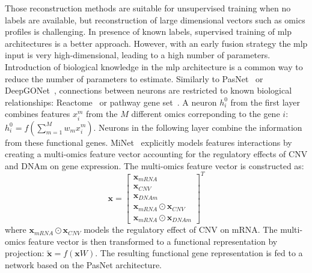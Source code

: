 \documentclass[../main.tex]{subfiles}
\begin{document}
		Those reconstruction methods are suitable for unsupervised training when no labels are available, but reconstruction of large dimensional vectors such as omics profiles is challenging. 
		In presence of known labels, supervised training of \gls{mlp} architectures is a better approach. 
		However, with an early fusion strategy the \gls{mlp} input is very high-dimensional, leading to a high number of parameters. 
		Introduction of biological knowledge in the \gls{mlp} architecture is a common way to reduce the number of parameters to estimate. 
		Similarly to PasNet~\cite{haoPASNetPathwayassociatedSparse2018} or DeepGONet~\cite{bourgeaisDeepGONetSelfexplainable2021}, connections between neurons are restricted to known biological relationships: Reactome~\cite{PNet} or pathway gene set~\cite{DeepOmix}.
		A neuron \(h^{0}_{i}\) from the first layer combines features \(x_{i}^{m}\) from the \(M\) different omics correponding to the gene \(i\): \(h^{0}_{i} = f\left( \sum_{m=1}^{M} w_{m}x_{i}^{m} \right) \). 
		Neurons in the following layer combine the information from these functional genes. 
		MiNet~\cite{Hao2019} explicitly models features interactions by creating a multi-omics feature vector accounting for the regulatory effects of CNV and DNAm on gene expression. 
		The multi-omics feature vector is constructed as:
		\begin{equation}
			\symbf{x} = {
				\begin{bmatrix}
				\symbf{x}_{mRNA}\\ 
				\symbf{x}_{CNV}\\ 
				\symbf{x}_{DNAm}\\ 
				\symbf{x}_{mRNA}\odot \symbf{x}_{CNV}\\ 
				\symbf{x}_{mRNA}\odot \symbf{x}_{DNAm} 
			\end{bmatrix}
			}^T
		\end{equation}
		where \(\symbf{x}_{mRNA}\odot \symbf{x}_{CNV}\) models the regulatory effect of CNV on mRNA. 
		The multi-omics feature vector is then transformed to a functional representation by projection: \(\tilde{\symbf{x}} = f\left(\symbf{x}W\right)\).
		The resulting functional gene representation is fed to a network based on the PasNet architecture.  
		
\end{document}
